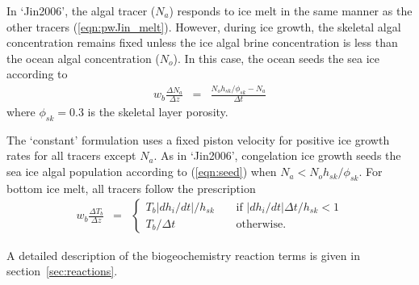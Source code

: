 In  `Jin2006', the algal tracer ($N_a$) responds to ice melt in the same manner as
the other tracers (\ref{eqn:pwJin_melt}).  However, during ice growth, the skeletal algal concentration remains fixed unless the ice algal brine concentration is less than the ocean algal concentration ($N_o$).  In this case, the ocean seeds the sea ice according to
\begin{eqnarray}
\label{eqn:seed}
w_b \frac{\Delta N_a}{\Delta z} & = & \frac{N_oh_{sk}/\phi_{sk} -
  N_a}{\Delta t}
\end{eqnarray}
where $\phi_{sk}=0.3$ is the skeletal layer porosity.

The `constant' formulation uses a fixed piston velocity for positive ice growth rates for all tracers except $N_a$.  As
in `Jin2006', congelation ice growth seeds the sea ice algal
population according to (\ref{eqn:seed}) when $N_a < N_o
h_{sk}/\phi_{sk}$. For bottom ice melt, all tracers follow the prescription
\begin{eqnarray}
 w_b \frac{\Delta T_b}{\Delta z} & = &  \left\{ \begin{array}{ll}
   T_b   |dh_i/dt|/h_{sk} \ \ \ \ \ &   \mbox{if }
 |dh_i/dt|\Delta t/h_{sk} < 1  \\
 T_b/\Delta t & \mbox{otherwise.}   \end{array} \right.
\label{eqn:constant_melt}
\end{eqnarray}

A detailed description of the biogeochemistry reaction terms is given
in section~\ref{sec:reactions}.

